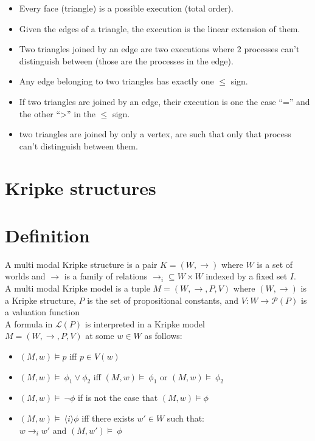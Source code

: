 \documentclass[oneside,openany]{tufte-book} %
\begin{document}
\begin{itemize}[topsep=0pt,itemsep=-1ex,partopsep=1ex,parsep=1ex]
\item Every face (triangle) is a possible execution (total order).
\item Given the edges of a triangle, the execution is the linear extension of them.
\item Two triangles joined by an edge are two executions where 2 processes can't distinguish between (those are the processes in the edge).
\item Any edge belonging to two triangles has exactly one $\le$ sign.
\item If two triangles are joined by an edge, their execution is one the case ``='' and the other ``>'' in the $\le$ sign.
\item two triangles are joined by only a vertex, are such that only that process can't distinguish between them.
\end{itemize}


\section{Kripke structures}

\section{Definition}

A multi modal Kripke structure is a pair $K = (W, \rightarrow)$ where $W$ is a set of worlds and $\rightarrow$ is a family of relations $\rightarrow_i \subseteq W \times W$ indexed by a fixed set $I$.\\

A multi modal Kripke model is a tuple $M=(W,\rightarrow,P,V)$ where $(W, \rightarrow)$ is a Kripke structure, $P$ is the set of propositional constants, and $V:W\rightarrow \mathcal{P}(P)$ is a valuation function\\

A formula in $\mathcal{L}(P)$ is interpreted in a Kripke model \\
$M=(W,\rightarrow,P,V)$ at some $w\in W$ as follows:
\begin{itemize}[topsep=0pt,itemsep=-1ex,partopsep=1ex,parsep=1ex]
\item $(M,w) \models p$ iff $p\in V(w)$
\item $(M,w) \models \ \phi_1 \vee \phi_2$ iff $(M,w) \models \ \phi_1$ or $(M,w) \models \ \phi_2$
\item $(M,w) \models \ \neg\phi$ if is not the case that $(M,w) \models \phi$
\item $(M,w) \models \ \langle i \rangle \phi$ iff there exists $w'\in W$ such that:\\ $w\rightarrow_i w'$ and  $(M,w') \models \ \phi$
\end{itemize}
\end{document}

